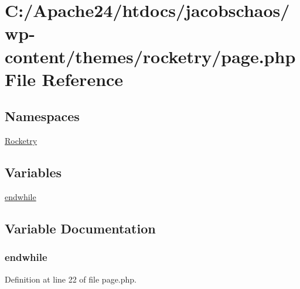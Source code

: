 \hypertarget{page_8php}{}\section{C\+:/\+Apache24/htdocs/jacobschaos/wp-\/content/themes/rocketry/page.php File Reference}
\label{page_8php}
\subsection*{Namespaces}
\begin{DoxyCompactItemize}
\item 
 \hyperlink{namespace_rocketry}{Rocketry}
\end{DoxyCompactItemize}
\subsection*{Variables}
\begin{DoxyCompactItemize}
\item 
\hyperlink{page_8php_a1b05dae45f9e3f4c1fe86048550d2c5b}{endwhile}
\end{DoxyCompactItemize}


\subsection{Variable Documentation}
\hypertarget{page_8php_a1b05dae45f9e3f4c1fe86048550d2c5b}{}
\subsubsection[{endwhile}]{\setlength{\rightskip}{0pt plus 5cm}endwhile}\label{page_8php_a1b05dae45f9e3f4c1fe86048550d2c5b}


Definition at line 22 of file page.\+php.

